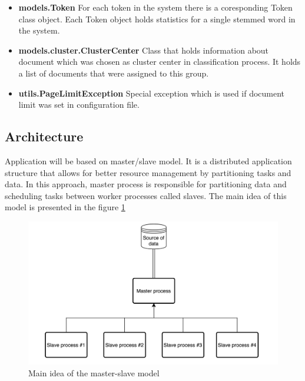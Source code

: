 \begin{itemize}
	\item \textbf{models.Token}\newline
	For each token in the system there is a coresponding Token class object. Each Token object holds statistics for a single stemmed word in the system.
	
	\item \textbf{models.cluster.ClusterCenter}\newline
	Class that holds information about document which was chosen as cluster center in classification process. It holds a list of documents that were assigned to this group.
	
	\item \textbf{utils.PageLimitException}\newline
	Special exception which is used if document limit was set in configuration file.
\end{itemize}

\subsection{Architecture}
Application will be based on master/slave model. It is a distributed application structure that allows for better resource management by partitioning tasks and data. In this approach, master process is responsible for partitioning data and scheduling tasks between worker processes called slaves. The main idea of this model is presented in the figure \ref{design-architecture}

\begin{figure}[H]
	\begin{center}
		\includegraphics[width=1.0\linewidth]{images/diagrams/architecture.png}
		\caption{Main idea of the master-slave model}
		\label{design-architecture}
	\end{center}
\end{figure}

